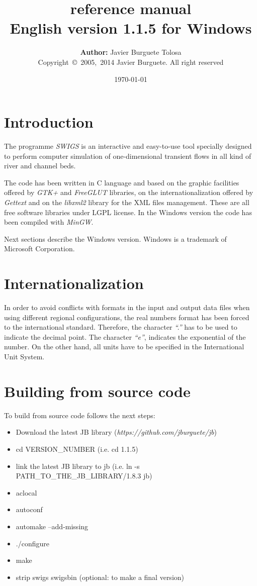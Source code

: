 \documentclass[a4paper,12pt]{article}
\title
{
	{\bf\Large {\swigs} reference manual}\\
	{\large	English version 1.1.5 for Windows}
}
\author
{
	{\bf Author:} Javier Burguete Tolosa\\
	{\small Copyright~\copyright~2005,~2014 Javier Burguete.
	All right reserved}
}
\date{\today}
\newcommand{\swigs}{\emph{SWIGS}}
\newcommand{\IT}[1]{{\sl ``#1''}}
\begin{document}
\maketitle

\tableofcontents
\clearpage

\setlength{\parskip}{\baselineskip / 2}

\section{Introduction}

The programme {\swigs} is an interactive and easy-to-use tool specially designed
to perform computer simulation of one-dimensional transient flows in all kind of
river and channel beds. 

The code has been written in C language and based on the graphic facilities
offered by \emph{GTK+} and \emph{FreeGLUT} libraries, on the
internationalization offered by \emph{Gettext} and on the \emph{libxml2} library
for the XML files management. These are all free software libraries under LGPL
license. In the Windows version the code has been compiled with \emph{MinGW}.

Next sections describe the Windows version. Windows is a trademark of Microsoft
Corporation.

\section{Internationalization}

In order to avoid conflicts with formats in the input and output data files when
using different regional configurations, the real numbers format has been forced
to the international standard. Therefore, the character \IT{.} has to be used to
indicate the decimal point. The character \IT{e}, indicates the exponential of
the number. On the other hand, all units have to be specified in the
International Unit System. 

\section{Building from source code}

To build from source code follows the next steps:
\begin{itemize}
	\item Download the latest JB library
		(\emph{https://github.com/jburguete/jb})
	\item cd VERSION\_NUMBER (i.e. cd 1.1.5)
	\item link the latest JB library to jb (i.e. ln -s
		PATH\_TO\_THE\_JB\_LIBRARY/1.8.3 jb)
	\item aclocal
	\item autoconf
	\item automake --add-missing
	\item ./configure
	\item make
	\item strip swigs swigsbin (optional: to make a final version)
\end{itemize}
\end{document}

